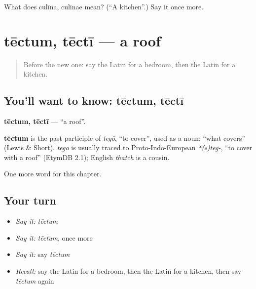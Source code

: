 \begin{tcolorbox}[breakable,colback=teal!4,colframe=teal!35!black,title={Before you move on}]
What does culīna, culīnae mean? (\textquotedblleft{}A kitchen\textquotedblright{}.) Say it once more.
\end{tcolorbox}
\section[tēctum, tēctī]{tēctum, tēctī — a roof}

\label{lesson:LA-C83-tectum}



\begin{quote}
Before the new one: say the Latin for a bedroom, then the Latin for a kitchen.
\end{quote}

\subsection*{You'll want to know: tēctum, tēctī}
\textbf{tēctum, tēctī} — \textquotedblleft{}a roof\textquotedblright{}.

\begin{cousinweb}
\textbf{tēctum} is the past participle of \emph{tegō}, \textquotedblleft{}to cover\textquotedblright{}, used as a noun: \textquotedblleft{}what covers\textquotedblright{} (Lewis \& Short). \emph{tegō} is usually traced to Proto-Indo-European \emph{*(s)teg-}, \textquotedblleft{}to cover with a roof\textquotedblright{} (EtymDB 2.1); English \emph{thatch} is a cousin.
\end{cousinweb}

\begin{grammarlens}[title={What you've built}]
One more word for this chapter.
\end{grammarlens}

\subsection*{Your turn}
\begin{itemize}
\raggedright
  \item \emph{Say it:} \emph{tēctum}
  \item \emph{Say it:} \emph{tēctum}, once more
  \item \emph{Say it:} say \emph{tēctum}
  \item \emph{Recall:} say the Latin for a bedroom, then the Latin for a kitchen, then say \emph{tēctum} again
\end{itemize}

